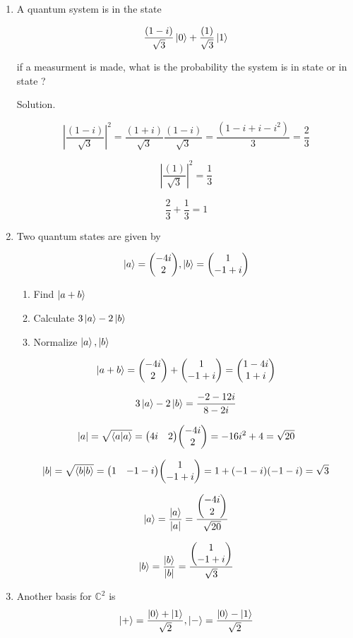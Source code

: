 \documentclass{article}
\begin{document}
\begin{enumerate}
\item A quantum system is in the state

\[\frac{(1-i)}{\sqrt{3}}\ket{0}+ \frac{(1)}{\sqrt{3}}\ket{1}\]

if a measurment is made, what is the probability the system is in state or in state  ?



Solution.

\[  | \frac{(1-i)}{\sqrt{3}} |^2  = \frac{(1+i)}{\sqrt{3}}  \frac{(1-i)}{\sqrt{3}} = \frac{(1-i+i-i^2)}{3} = \frac{2}{3}  \]

\[  | \frac{(1)}{\sqrt{3}} |^2  = \frac{1}{3} \] 

\[\frac{2}{3} + \frac{1}{3} =1 \]
\item Two quantum states are given by

\[\ket{a}= \mqty( -4i \\ 2 ) , \ket{b}= \mqty( 1 \\ -1+i )\] 

\begin{enumerate}
   \item Find $\ket{a+b}$
   \item Calculate $3\ket{a}-2\ket{b}$
   \item Normalize $\ket{a},\ket{b}$
\end{enumerate}   

\[\ket{a+b} =  \mqty( -4i \\ 2 ) + \mqty( 1 \\ -1+i )= \mqty( 1-4i \\ 1+i )\] 

\[3\ket{a}-2\ket{b}=\frac{-2-12i}{8-2i} \]

\[ |a| =\sqrt{\bra{a}\ket{a}} = \mqty( 4i & 2)\mqty( -4i \\ 2 ) = -16i^2 +4=\sqrt{20} \]

\[ |b| =\sqrt{\bra{b}\ket{b}} = \mqty( 1 & -1-i)\mqty( 1 \\ -1+i ) =1+(-1-i)(-1-i)=\sqrt{3} \]

\[\ket{a} = \frac{\ket{a}}{|a|} = \frac{\mqty( -4i \\ 2 )}{\sqrt{20}}\]

\[\ket{b} = \frac{\ket{b}}{|b|} =  \frac{\mqty( 1 \\ -1+i )}{\sqrt{3}}\]


\item Another basis for $\mathbb{C}^{2}$  is
\[  \ket{+}=\frac{\ket{0}+\ket{1}}{\sqrt{2}}, \ket{-}=\frac{\ket{0}-\ket{1}}{\sqrt{2}}  \]


\end{enumerate}
\end{document}
